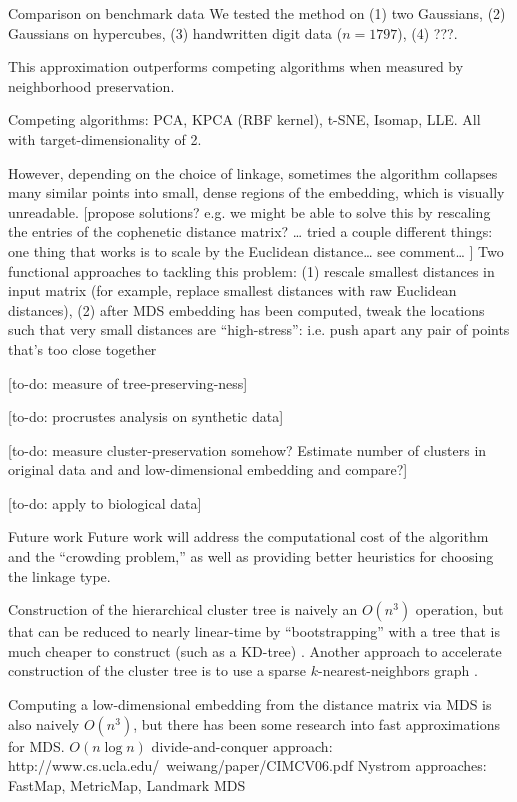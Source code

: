 \documentclass{article}
\begin{document}
Comparison on benchmark data
We tested the method on (1) two Gaussians, (2) Gaussians on hypercubes, (3) handwritten digit data ($n=1797$), (4) ???.

This approximation outperforms competing algorithms when measured by neighborhood preservation.

Competing algorithms: PCA, KPCA (RBF kernel), t-SNE, Isomap, LLE. All with target-dimensionality of 2.

However, depending on the choice of linkage, sometimes the algorithm collapses many similar points into small, dense regions of the embedding, which is visually unreadable. [propose solutions? e.g. we might be able to solve this by rescaling the entries of the cophenetic distance matrix? … tried a couple different things: one thing that works is to scale by the Euclidean distance… see comment… ]
Two functional approaches to tackling this problem: (1) rescale smallest distances in input matrix (for example, replace smallest distances with raw Euclidean distances), (2) after MDS embedding has been computed, tweak the locations such that very small distances are “high-stress”: i.e. push apart any pair of points that’s too close together

[to-do: measure of tree-preserving-ness]

[to-do: procrustes analysis on synthetic data]

[to-do: measure cluster-preservation somehow? Estimate number of clusters in original data and and low-dimensional embedding and compare?]

[to-do: apply to biological data]

Future work
Future work will address the computational cost of the algorithm and the “crowding problem,” as well as providing better heuristics for choosing the linkage type.

Construction of the hierarchical cluster tree is naively an $O(n^3)$ operation, but that can be reduced to nearly linear-time by “bootstrapping” with a tree that is much cheaper to construct (such as a KD-tree) \cite{fast_agglom_clust_kdtree}. Another approach to accelerate construction of the cluster tree is to use a sparse $k$-nearest-neighbors graph \cite{fast_agglom_clust_knn}.

Computing a low-dimensional embedding from the distance matrix via MDS is also naively $O(n^3)$, but there has been some research into fast approximations for MDS.
$O(n \log n)$ divide-and-conquer approach: http://www.cs.ucla.edu/~weiwang/paper/CIMCV06.pdf
Nystrom approaches: FastMap, MetricMap, Landmark MDS
\end{document}
